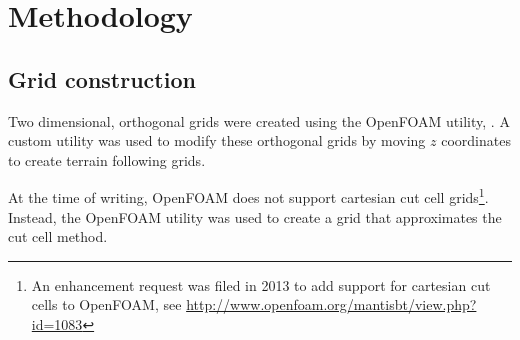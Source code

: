 \chapter{Methodology}

\section{Grid construction}
Two dimensional, orthogonal grids were created using the OpenFOAM utility, .  A custom utility was used to modify these orthogonal grids by moving $z$ coordinates to create terrain following grids.

At the time of writing, OpenFOAM does not support cartesian cut cell grids\footnote{An enhancement request was filed in 2013 to add support for cartesian cut cells to OpenFOAM, see \url{http://www.openfoam.org/mantisbt/view.php?id=1083}}.  Instead, the  OpenFOAM utility was used to create a grid that approximates the cut cell method.
